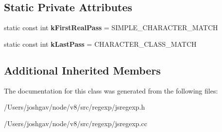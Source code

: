 \subsection*{Static Private Attributes}
\begin{DoxyCompactItemize}
\item 
static const int {\bfseries k\+First\+Real\+Pass} = S\+I\+M\+P\+L\+E\+\_\+\+C\+H\+A\+R\+A\+C\+T\+E\+R\+\_\+\+M\+A\+T\+CH\hypertarget{classv8_1_1internal_1_1_text_node_a736ac85df09cd5a4be7c792fbeb1c3ee}{}\label{classv8_1_1internal_1_1_text_node_a736ac85df09cd5a4be7c792fbeb1c3ee}

\item 
static const int {\bfseries k\+Last\+Pass} = C\+H\+A\+R\+A\+C\+T\+E\+R\+\_\+\+C\+L\+A\+S\+S\+\_\+\+M\+A\+T\+CH\hypertarget{classv8_1_1internal_1_1_text_node_a219d903ef5084c3963b02c040580b21a}{}\label{classv8_1_1internal_1_1_text_node_a219d903ef5084c3963b02c040580b21a}

\end{DoxyCompactItemize}
\subsection*{Additional Inherited Members}


The documentation for this class was generated from the following files\+:\begin{DoxyCompactItemize}
\item 
/\+Users/joshgav/node/v8/src/regexp/jsregexp.\+h\item 
/\+Users/joshgav/node/v8/src/regexp/jsregexp.\+cc\end{DoxyCompactItemize}
